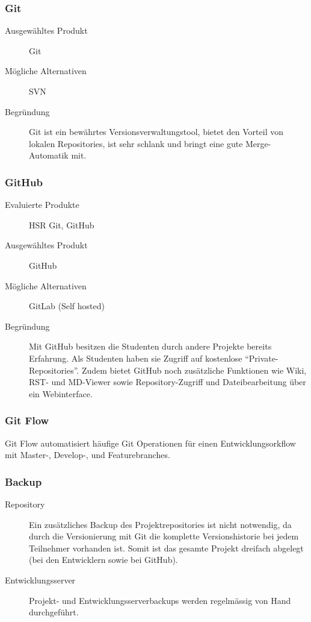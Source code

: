 			\subsubsection{Git}
				\begin{description}
					\item[Ausgewähltes Produkt] Git
					\item[Mögliche Alternativen] SVN
					\item[Begründung] Git ist ein bewährtes Versionsverwaltungstool, bietet den Vorteil von lokalen Repositories, ist sehr schlank und bringt eine gute Merge-Automatik mit.
				\end{description}

			\subsubsection{GitHub}
				\begin{description}
					\item[Evaluierte Produkte] HSR Git, GitHub
					\item[Ausgewähltes Produkt] GitHub
					\item[Mögliche Alternativen] GitLab (Self hosted)
					\item[Begründung] Mit GitHub besitzen die Studenten durch andere Projekte bereits Erfahrung. 
						Als Studenten haben sie Zugriff auf kostenlose "`Private-Repositories"'. 
						Zudem bietet GitHub noch zusätzliche Funktionen wie Wiki, RST- und MD-Viewer sowie
						Repository-Zugriff und Dateibearbeitung über ein Webinterface.
				\end{description}
				
			\subsubsection{Git Flow}
				Git Flow automatisiert häufige Git Operationen für einen Entwicklungsorkflow mit Master-, Develop-, und Featurebranches.

			\subsubsection{Backup}
				\begin{description}
					\item[Repository] Ein zusätzliches Backup des Projektrepositories ist nicht notwendig, da durch die Versionierung mit Git die komplette Versionshistorie bei jedem Teilnehmer vorhanden ist. Somit ist das gesamte Projekt dreifach abgelegt (bei den Entwicklern sowie bei GitHub).				
					\item[Entwicklungsserver] Projekt- und Entwicklungsserverbackups werden regelmässig von Hand durchgeführt.
				\end{description}

